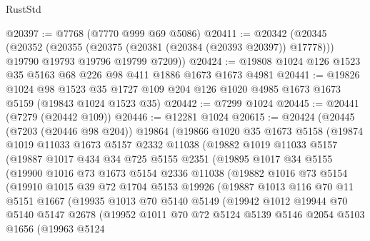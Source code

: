 \begin{lexlean}{RustStd}
\begin{coremodule}
@20397 := @7768 (@7770 @999 @69 @5086)
@20411 := @20342
    (@20345
      (@20352
        (@20355 (@20375 (@20381 (@20384 (@20393 @20397)) @17778)))
        @19790
        @19793
        @19796
        @19799
        @7209))
@20424 := @19808 @1024 @126 @1523 @35 @5163 @68 @226 @98 @411 @1886 @1673 @1673 @4981
@20441 := @19826
    @1024
    @98
    @1523
    @35
    @1727
    @109
    @204
    @126
    @1020
    @4985
    @1673
    @1673
    @5159
    (@19843 @1024 @1523 @35)
@20442 := @7299 @1024
@20445 := @20441 (@7279 (@20442 @109))
@20446 := @12281 @1024
@20615 := @20424
    (@20445
      (@7203 (@20446 @98 @204))
      @19864
      (@19866
        @1020
        @35
        @1673
        @5158
        (@19874
          @1019
          @11033
          @1673
          @5157
          @2332
          @11038
          (@19882
            @1019
            @11033
            @5157
            (@19887
              @1017
              @434
              @34
              @725
              @5155
              @2351
              (@19895
                @1017
                @34
                @5155
                (@19900
                  @1016
                  @73
                  @1673
                  @5154
                  @2336
                  @11038
                  (@19882
                    @1016
                    @73
                    @5154
                    (@19910
                      @1015
                      @39
                      @72
                      @1704
                      @5153
                      @19926
                      (@19887
                        @1013
                        @116
                        @70
                        @11
                        @5151
                        @1667
                        (@19935
                          @1013
                          @70
                          @5140
                          @5149
                          (@19942
                            @1012
                            @19944
                            @70
                            @5140
                            @5147
                            @2678
                            (@19952
                              @1011
                              @70
                              @72
                              @5124
                              @5139
                              @5146
                              @2054
                              @5103
                              @1656
                              (@19963
                                @5124

\end{coremodule}
\end{lexlean}
